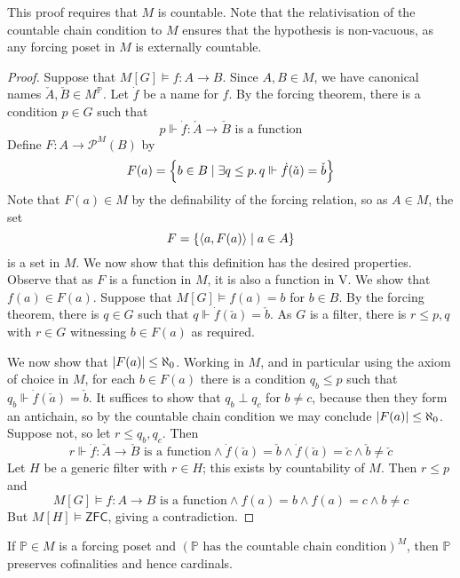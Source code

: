 This proof requires that \( M \) is countable.
Note that the relativisation of the countable chain condition to \( M \) ensures that the hypothesis is non-vacuous, as any forcing poset in \( M \) is externally countable.
\begin{proof}
    Suppose that \( M[G] \vDash f : A \to B \).
    Since \( A, B \in M \), we have canonical names \( \check A, \check B \in M^{\mathbb P} \).
    Let \( \dot f \) be a name for \( f \).
    By the forcing theorem, there is a condition \( p \in G \) such that
    \[ p \Vdash \dot f : \check A \to \check B \text{ is a function} \]
    Define \( F : A \to \mathcal P^M(B) \) by
    \[ F(a) = \qty{b \in B \mid \exists q \leq p.\, q \Vdash \dot f(\check a) = \check b} \]
    Note that \( F(a) \in M \) by the definability of the forcing relation, so as \( A \in M \), the set
    \[ F = \qty{\langle a, F(a) \rangle \mid a \in A} \]
    is a set in \( M \).
    We now show that this definition has the desired properties.
    Observe that as \( F \) is a function in \( M \), it is also a function in \( \mathrm{V} \).
    We show that \( f(a) \in F(a) \).
    Suppose that \( M[G] \vDash f(a) = b \) for \( b \in B \).
    By the forcing theorem, there is \( q \in G \) such that \( q \Vdash \dot f(\check a) = \check b \).
    As \( G \) is a filter, there is \( r \leq p, q \) with \( r \in G \) witnessing \( b \in F(a) \) as required.

    We now show that \( \abs{F(a)} \leq \aleph_0 \).
    Working in \( M \), and in particular using the axiom of choice in \( M \), for each \( b \in F(a) \) there is a condition \( q_b \leq p \) such that \( q_b \Vdash \dot f(\check a) = \check b \).
    It suffices to show that \( q_b \perp q_c \) for \( b \neq c \), because then they form an antichain, so by the countable chain condition we may conclude \( \abs{F(a)} \leq \aleph_0 \).
    Suppose not, so let \( r \leq q_b, q_c \).
    Then
    \[ r \Vdash \dot f : \check A \to \check B \text{ is a function} \wedge \dot f(\check a) = \check b \wedge \dot f(\check a) = \check c \wedge \check b \neq \check c \]
    Let \( H \) be a generic filter with \( r \in H \); this exists by countability of \( M \).
    Then \( r \leq p \) and
    \[ M[G] \vDash f : A \to B \text{ is a function} \wedge f(a) = b \wedge f(a) = c \wedge b \neq c \]
    But \( M[H] \vDash \mathsf{ZFC} \), giving a contradiction.
\end{proof}
\begin{theorem}
    If \( \mathbb P \in M \) is a forcing poset and \( (\mathbb P \text{ has the countable chain condition})^M \), then \( \mathbb P \) preserves cofinalities and hence cardinals.
\end{theorem}
